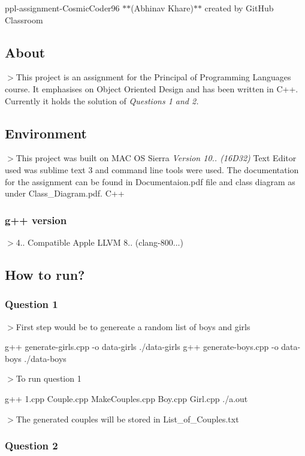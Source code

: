 ppl-\/assignment-\/\+Cosmic\+Coder96 $\ast$$\ast$(Abhinav Khare)$\ast$$\ast$ created by Git\+Hub Classroom

\subsection*{About}

$>$This project is an assignment for the Principal of Programming Languages course. It emphasises on Object Oriented Design and has been written in C++. Currently it holds the solution of {\itshape Questions 1 and 2.}

\subsection*{Environment}

$>$This project was built on M\+AC OS Sierra {\itshape Version 10.. (16\+D32)} Text Editor used was sublime text 3 and command line tools were used. The documentation for the assignment can be found in Documentaion.\+pdf file and class diagram as under Class\+\_\+\+Diagram.\+pdf. C++ \subsubsection*{g++ version}

$>$4.. Compatible Apple L\+L\+VM 8.. (clang-\/800...)

\subsection*{How to run?}

\subsubsection*{Question 1}

$>$First step would be to genereate a random list of boys and girls 
\begin{DoxyCode}
g++ generate-girls.cpp -o data-girls
./data-girls
g++ generate-boys.cpp -o data-boys
./data-boys
\end{DoxyCode}
 $>$To run question 1 
\begin{DoxyCode}
g++ 1.cpp Couple.cpp MakeCouples.cpp Boy.cpp Girl.cpp
./a.out
\end{DoxyCode}
 $>$The generated couples will be stored in List\+\_\+of\+\_\+\+Couples.\+txt

\subsubsection*{Question 2}


